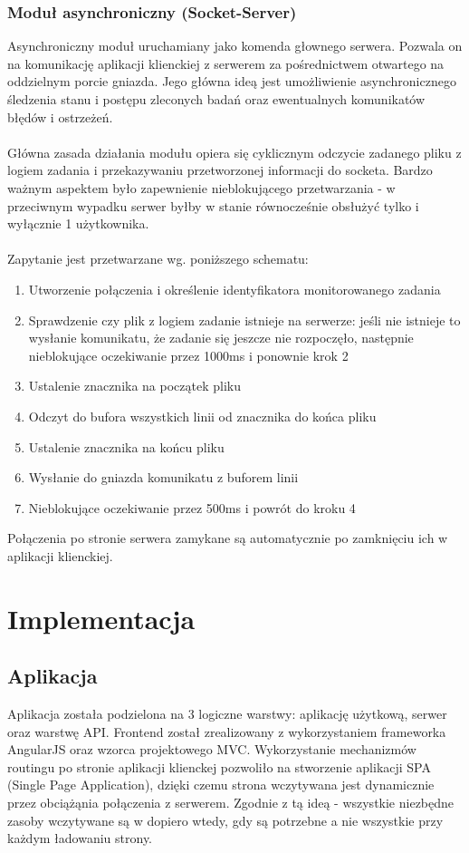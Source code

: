 \documentclass[a4paper,onecolumn,oneside,12pt]{memoir}
\begin{document}
{\subsection{Moduł asynchroniczny (Socket-Server)}
\quad \quad Asynchroniczny moduł uruchamiany jako komenda głownego serwera. Pozwala on na
komunikację aplikacji klienckiej z serwerem za pośrednictwem otwartego na oddzielnym
porcie gniazda. Jego główna ideą jest umożliwienie asynchronicznego śledzenia
stanu i postępu zleconych badań oraz ewentualnych komunikatów błędów i ostrzeżeń.\\
\\
Główna zasada działania modułu opiera się cyklicznym odczycie zadanego pliku z logiem
zadania i przekazywaniu przetworzonej informacji do socketa. Bardzo ważnym aspektem
było zapewnienie nieblokującego przetwarzania - w przeciwnym wypadku serwer byłby
w stanie równocześnie obsłużyć tylko i wyłącznie 1 użytkownika.\\
\\
Zapytanie jest przetwarzane wg. poniższego schematu:
\begin{enumerate}
\item Utworzenie połączenia i określenie identyfikatora monitorowanego zadania
\item Sprawdzenie czy plik z logiem zadanie istnieje na serwerze: jeśli nie istnieje
to wysłanie komunikatu, że zadanie się jeszcze nie rozpoczęło, następnie nieblokujące
oczekiwanie przez 1000ms i ponownie krok 2
\item Ustalenie znacznika na początek pliku
\item Odczyt do bufora wszystkich linii od znacznika do końca pliku
\item Ustalenie znacznika na końcu pliku
\item Wysłanie do gniazda komunikatu z buforem linii
\item Nieblokujące oczekiwanie przez 500ms i powrót do kroku 4
\end{enumerate}

Połączenia po stronie serwera zamykane są automatycznie po zamknięciu ich w aplikacji
klienckiej.\\

\chapter{Implementacja}
\section{Aplikacja}
\quad \quad Aplikacja została podzielona na 3 logiczne warstwy: aplikację użytkową, serwer oraz
warstwę API. Frontend został zrealizowany z wykorzystaniem frameworka AngularJS oraz wzorca projektowego MVC.
Wykorzystanie mechanizmów routingu po stronie aplikacji klienckej pozwoliło na stworzenie aplikacji SPA (Single
Page Application), dzięki czemu strona wczytywana jest dynamicznie przez obciążąnia połączenia z serwerem.
Zgodnie z tą ideą - wszystkie niezbędne zasoby wczytywane są w dopiero wtedy, gdy są potrzebne a nie
wszystkie przy każdym ładowaniu strony.

}
\end{document}

